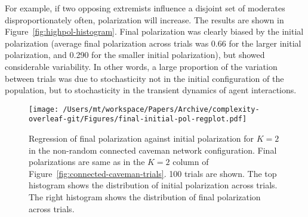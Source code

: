 For example, if two opposing extremists influence a disjoint set of moderates disproportionately 
often, polarization will increase. The results are shown in Figure~\ref{fig:highpol-histogram}.  
Final polarization was clearly biased by the initial polarization (average final polarization across trials  
was 0.66 for the larger initial polarization, and 0.290 for the smaller initial polarization), but showed considerable variability. 
In other words, a large proportion of the variation between trials was due to stochasticity not in the initial configuration of the population, but to stochasticity in the transient dynamics of agent interactions.


\begin{figure}[H]
  \centering
    \texttt{[image: /Users/mt/workspace/Papers/Archive/complexity-overleaf-git/Figures/final-initial-pol-regplot.pdf]}
  \caption{Regression of final polarization against initial polarization 
    for $K=2$ in the non-random connected caveman network configuration.
    Final polarizations are same as in the $K=2$ column of 
    Figure~\ref{fig:connected-caveman-trials}. 100 trials are shown. The
    top histogram shows the distribution of initial polarization across
    trials. The right histogram shows the distribution of final polarization
    across trials.}
  \label{fig:final-initial-pol-regplot}
\end{figure}

